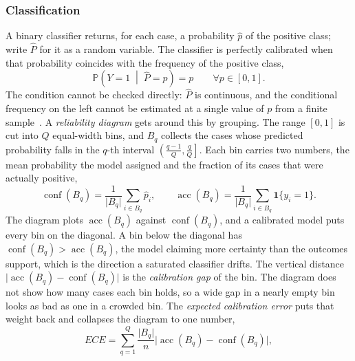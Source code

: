     \subsubsection{Classification}
        A binary classifier returns, for each case, a probability $\hat{p}$ of the
        positive class; write $\hat{P}$ for it as a random variable. The classifier
        is perfectly calibrated when that probability coincides with the frequency
        of the positive class,
        \begin{equation}
            \mathbb{P}\!\left( Y = 1 \;\middle|\; \hat{P} = p \right) = p
            \qquad \forall p \in [0, 1].
            \label{eq:bg:unc:calibclf}
        \end{equation}
        The condition cannot be checked directly: $\hat{P}$ is
        continuous, and the conditional frequency on the left cannot be estimated at a
        single value of $p$ from a finite sample~\cite{guo2017}.
        A \emph{reliability diagram} gets around this by grouping. The range $[0, 1]$ is
        cut into $Q$ equal-width bins, and $B_q$ collects the cases whose predicted
        probability falls in the $q$-th interval
        $\left( \tfrac{q-1}{Q}, \tfrac{q}{Q} \right]$. Each bin carries two numbers, the
        mean probability the model assigned and the fraction of its cases that were
        actually positive,
        \begin{equation}
            \operatorname{conf}(B_q) = \frac{1}{\lvert B_q \rvert} \sum_{i \in B_q} \hat{p}_i ,
            \qquad
            \operatorname{acc}(B_q) = \frac{1}{\lvert B_q \rvert} \sum_{i \in B_q} \mathbf{1}\{ y_i = 1 \} .
            \label{eq:bg:unc:confacc}
        \end{equation}
        The diagram plots $\operatorname{acc}(B_q)$ against $\operatorname{conf}(B_q)$,
        and a calibrated model puts every bin on the diagonal. A bin below the diagonal
        has $\operatorname{conf}(B_q) > \operatorname{acc}(B_q)$, the model claiming more
        certainty than the outcomes support, which is the direction a saturated
        classifier drifts. The vertical distance
        $\lvert \operatorname{acc}(B_q) - \operatorname{conf}(B_q) \rvert$ is the
        \emph{calibration gap} of the bin. The diagram does not show how many cases
        each bin holds, so a wide gap in a nearly empty bin looks as bad as one in a
        crowded bin.
        The \emph{expected calibration error} puts that weight back and collapses the
        diagram to one number,
        \begin{equation}
            ECE = \sum_{q=1}^{Q} \frac{\lvert B_q \rvert}{n}
            \bigl\lvert \operatorname{acc}(B_q) - \operatorname{conf}(B_q) \bigr\rvert ,
            \label{eq:bg:unc:ece}
        \end{equation}
